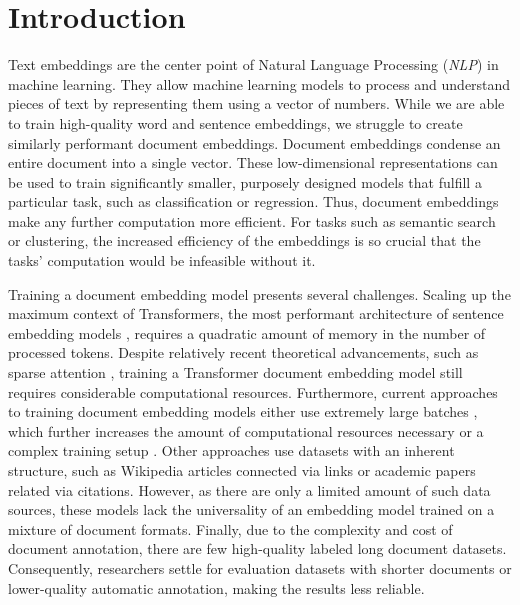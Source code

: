 \chapter*{Introduction}

Text embeddings are the center point of Natural Language Processing
(\emph{NLP}) in machine learning. They allow machine learning models to process
and understand pieces of text by representing them using a vector of numbers.
While we are able to train high-quality word and sentence embeddings, we
struggle to create similarly performant document embeddings. Document
embeddings condense an entire document into a single vector. These
low-dimensional representations can be used to train significantly smaller,
purposely designed models that fulfill a particular task, such as
classification or regression. Thus, document embeddings make any further
computation more efficient. For tasks such as semantic search or clustering,
the increased efficiency of the embeddings is so crucial that the tasks'
computation would be infeasible without it.

Training a document embedding model presents several challenges. Scaling up the
maximum context of Transformers, the most performant architecture of
sentence embedding models \citep{reimers2019sentence,gao2021simcse}, requires a
quadratic amount of memory in the number of processed tokens. Despite
relatively recent theoretical advancements, such as sparse attention
\citep{child2019generating}, training a Transformer document embedding model
still requires considerable computational resources. Furthermore, current
approaches to training document embedding models either use extremely large
batches \citep{neelakantan2022text}, which further increases the amount of
computational resources necessary or a complex training setup
\citep{izacard2021unsupervised}. Other approaches
\citep{ostendorff2022neighborhood, cohan2020specter} use datasets with an
inherent structure, such as Wikipedia articles connected via links or academic
papers related via citations. However, as there are only a limited amount of
such data sources, these models lack the universality of an embedding model trained
on a mixture of document formats. Finally, due to the complexity and cost of
document annotation, there are few high-quality labeled long document
datasets. Consequently, researchers settle for evaluation datasets with shorter documents
or lower-quality automatic annotation, making the results less
reliable.

